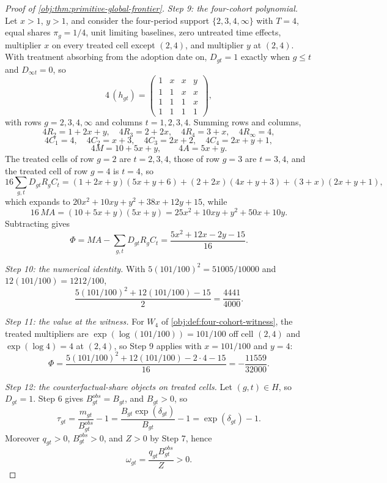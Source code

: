\documentclass[11pt]{article}
\begin{document}
\begin{proof}[Proof of \cref{obj:thm:primitive-global-frontier}]
\textit{Step 9: the four-cohort polynomial.} Let \(x>1\), \(y>1\), and consider the four-period support \(\{2,3,4,\infty\}\) with \(T=4\), equal shares \(\pi_g=1/4\), unit limiting baselines, zero untreated time effects, multiplier \(x\) on every treated cell except \((2,4)\), and multiplier \(y\) at \((2,4)\). With treatment absorbing from the adoption date on, \(D_{gt}=1\) exactly when \(g\le t\) and \(D_{\infty t}=0\), so
\[
4\,(h_{gt})=
\begin{pmatrix}
1&x&x&y\\
1&1&x&x\\
1&1&1&x\\
1&1&1&1
\end{pmatrix},
\]
with rows \(g=2,3,4,\infty\) and columns \(t=1,2,3,4\). Summing rows and columns,
\[
4R_2=1+2x+y,
\quad
4R_3=2+2x,
\quad
4R_4=3+x,
\quad
4R_\infty=4,
\]
\[
4C_1=4,
\quad
4C_2=x+3,
\quad
4C_3=2x+2,
\quad
4C_4=2x+y+1,
\]
\[
4M=10+5x+y,
\qquad
4A=5x+y .
\]
The treated cells of row \(g=2\) are \(t=2,3,4\), those of row \(g=3\) are \(t=3,4\), and the treated cell of row \(g=4\) is \(t=4\), so
\[
16\sum_{g,t}D_{gt}R_gC_t
=
(1+2x+y)(5x+y+6)+(2+2x)(4x+y+3)+(3+x)(2x+y+1),
\]
which expands to \(20x^2+10xy+y^2+38x+12y+15\), while
\[
16\,MA=(10+5x+y)(5x+y)=25x^2+10xy+y^2+50x+10y .
\]
Subtracting gives
\[
\Phi=MA-\sum_{g,t}D_{gt}R_gC_t=\frac{5x^2+12x-2y-15}{16}.
\]

\textit{Step 10: the numerical identity.} With \(5(101/100)^2=51005/10000\) and \(12(101/100)=1212/100\),
\[
\frac{5(101/100)^2+12(101/100)-15}{2}=\frac{4441}{4000}.
\]

\textit{Step 11: the value at the witness.} For \(W_4\) of \cref{obj:def:four-cohort-witness}, the treated multipliers are \(\exp(\log(101/100))=101/100\) off cell \((2,4)\) and \(\exp(\log4)=4\) at \((2,4)\), so Step 9 applies with \(x=101/100\) and \(y=4\):
\[
\Phi=\frac{5(101/100)^2+12(101/100)-2\cdot4-15}{16}=-\frac{11559}{32000}.
\]

\textit{Step 12: the counterfactual-share objects on treated cells.} Let \((g,t)\in H\), so \(D_{gt}=1\). Step 6 gives \(B^{obs}_{gt}=B_{gt}\), and \(B_{gt}>0\), so
\[
\tau_{gt}=\frac{m_{gt}}{B^{obs}_{gt}}-1
=\frac{B_{gt}\exp(\delta_{gt})}{B_{gt}}-1
=\exp(\delta_{gt})-1 .
\]
Moreover \(q_{gt}>0\), \(B^{obs}_{gt}>0\), and \(Z>0\) by Step 7, hence
\[
\omega_{gt}=\frac{q_{gt}B^{obs}_{gt}}{Z}>0 .
\]


\end{proof}
\end{document}
